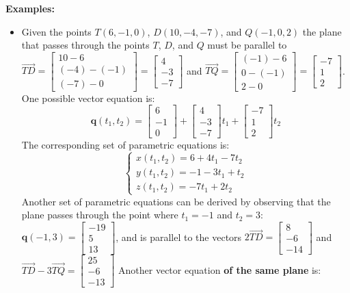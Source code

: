 \documentclass{article}
\begin{document}
\textbf{Examples:}
\begin{itemize}
\item Given the points \(T(6, -1, 0)\), \(D(10, -4, -7)\), and \(Q(-1, 0, 2)\) the plane that passes through the points \(T\), \(D\), and \(Q\) must be parallel to \(\overrightarrow{TD} = \begin{bmatrix} 10 - 6 \\ (-4) - (-1) \\ (-7) - 0 \end{bmatrix} = \begin{bmatrix} 4 \\ -3 \\ -7 \end{bmatrix}\) and \(\overrightarrow{TQ} = \begin{bmatrix} (-1) - 6 \\ 0 - (-1) \\ 2 - 0 \end{bmatrix} = \begin{bmatrix} -7 \\ 1 \\ 2 \end{bmatrix}\). One possible vector equation is:
\[\mathbf{q}(t_1, t_2) = \begin{bmatrix} 6 \\ -1 \\ 0 \end{bmatrix} + \begin{bmatrix} 4 \\ -3 \\ -7 \end{bmatrix}t_1 + \begin{bmatrix} -7 \\ 1 \\ 2 \end{bmatrix}t_2\] 
The corresponding set of parametric equations is: 
\[\left\{\begin{array}{c} x(t_1, t_2) = 6 + 4t_1 - 7t_2 \\ y(t_1, t_2) = -1 - 3t_1 + t_2 \\ z(t_1, t_2) = -7t_1 + 2t_2 \end{array}\right.\]
Another set of parametric equations can be derived by observing that the plane passes through the point where \(t_1 = -1\) and \(t_2 = 3\): \(\mathbf{q}(-1, 3) = \begin{bmatrix} -19 \\ 5 \\ 13 \end{bmatrix}\), and is parallel to the vectors \(2\overrightarrow{TD} = \begin{bmatrix} 8 \\ -6 \\ -14 \end{bmatrix}\) and \(\overrightarrow{TD} - 3\overrightarrow{TQ} = \begin{bmatrix}  25 \\ -6 \\ -13 \end{bmatrix}\) Another vector equation {\bf of the same plane} is: 

\end{itemize}
\end{document}
